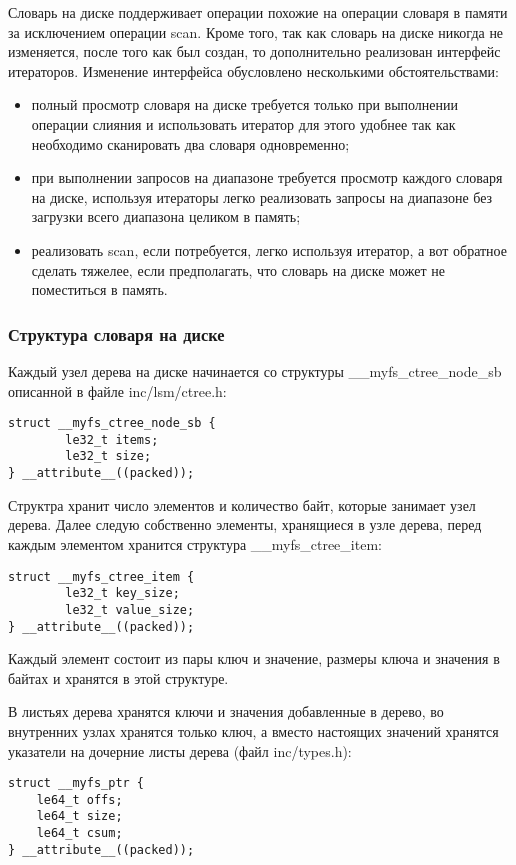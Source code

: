 Словарь на диске поддерживает операции похожие на операции словаря в памяти за
исключением операции scan. Кроме того, так как словарь на диске никогда не
изменяется, после того как был создан, то дополнительно реализован интерфейс
итераторов. Изменение интерфейса обусловлено несколькими обстоятельствами:
\begin{itemize}
  \item полный просмотр словаря на диске требуется только при выполнении
        операции слияния и использовать итератор для этого удобнее так как
        необходимо сканировать два словаря одновременно;
  \item при выполнении запросов на диапазоне требуется просмотр каждого словаря
        на диске, используя итераторы легко реализовать запросы на диапазоне без
        загрузки всего диапазона целиком в память;
  \item реализовать scan, если потребуется, легко используя итератор, а вот
        обратное сделать тяжелее, если предполагать, что словарь на диске может
        не поместиться в память.
\end{itemize}

\subsubsection{Структура словаря на диске}

Каждый узел дерева на диске начинается со структуры \_\_myfs\_ctree\_node\_sb
описанной в файле inc/lsm/ctree.h:
\begin{lstlisting}
struct __myfs_ctree_node_sb {
        le32_t items;
        le32_t size;
} __attribute__((packed));
\end{lstlisting}

Структра хранит число элементов и количество байт, которые занимает узел дерева.
Далее следую собственно элементы, хранящиеся в узле дерева, перед каждым
элементом хранится структура \_\_myfs\_ctree\_item:
\begin{lstlisting}
struct __myfs_ctree_item {
        le32_t key_size;
        le32_t value_size;
} __attribute__((packed));
\end{lstlisting}
Каждый элемент состоит из пары ключ и значение, размеры ключа и значения в
байтах и хранятся в этой структуре.

В листьях дерева хранятся ключи и значения добавленные в дерево, во внутренних
узлах хранятся только ключ, а вместо настоящих значений хранятся указатели на
дочерние листы дерева (файл inc/types.h):
\begin{lstlisting}
struct __myfs_ptr {
    le64_t offs;
    le64_t size;
    le64_t csum;
} __attribute__((packed));
\end{lstlisting}

